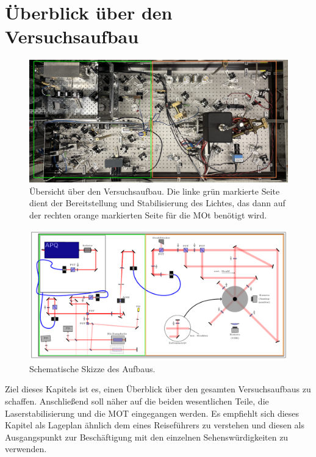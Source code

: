 \documentclass[
class=book,
accentcolor=1b,
custommargins=geometry,
fontsize=11pt,
thesis={type=Versuchsanleitung},
ruledheaders=all,
headline=false,
instbox=false,
marginpar=false,
title=small,
ignore-missing-data=true,
twoside=false,
logofile=apqdesign/tuda_logo.pdf,
pdfa=false %
]{apqpub}
\newcommand{\gqq}[1]{\glqq{}#1\grqq{}}
\begin{document}
\chapter{Überblick über den Versuchsaufbau}
\label{chap:ueberblick}
\begin{figure}[htb!]
	\centering
	\includegraphics[width=\textwidth]{graphics/setup_real_cropped_marked.jpg}
	\caption{Übersicht über den Versuchsaufbau. Die linke grün markierte Seite dient der Bereitstellung und Stabilisierung des Lichtes, das dann auf der rechten orange markierten Seite für die MOt benötigt wird.}
	\label{fig:GUE}
\end{figure}
\begin{figure}[htb!]
	\centering
	\includegraphics[width=\textwidth]{graphics/setup_fp_mot.pdf}
	\caption{Schematische Skizze des Aufbaus.}
	\label{fig:TZ}
\end{figure} 
Ziel dieses Kapitels ist es, einen Überblick über den gesamten Versuchsaufbaus zu schaffen. 
Anschließend soll näher auf die beiden wesentlichen Teile, die Laserstabilisierung und die MOT eingegangen werden. 
Es empfiehlt sich dieses Kapitel als Lageplan ähnlich dem eines Reiseführers zu verstehen und diesen als Ausgangspunkt zur Beschäftigung mit den einzelnen \gqq{Sehenswürdigkeiten} zu verwenden.\\
\end{document}
